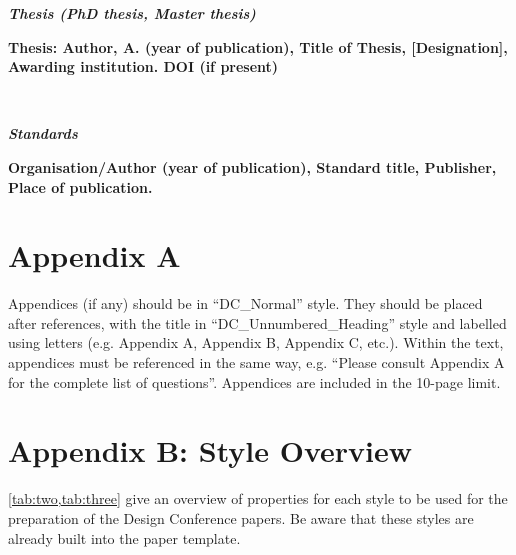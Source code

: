 \documentclass{design}
\begin{document}
\textbf{\textit{Thesis (PhD thesis, Master thesis)}}

\begin{hangparas}{0.63cm}{1}
\textbf{Thesis: Author, A. (year of publication), Title of Thesis, [Designation], Awarding institution. DOI (if present)}

\\[-0.5em]

\end{hangparas}


\textbf{\textit{Standards}}

\begin{hangparas}{0.63cm}{1}
\textbf{Organisation/Author (year of publication), Standard title, Publisher, Place of publication.}

\end{hangparas}


\section*{Appendix A}

Appendices (if any) should be in “DC\_Normal” style. They should be placed after references, with the title in “DC\_Unnumbered\_Heading” style and labelled using letters (e.g. Appendix A, Appendix B, Appendix C, etc.). Within the text, appendices must be referenced in the same way, e.g. “Please consult Appendix A for the complete list of questions”. Appendices are included in the 10-page limit.

\section*{Appendix B: Style Overview}

\cref{tab:two,tab:three} give an overview of properties for each style to be used for the preparation of the Design Conference papers. Be aware that these styles are already built into the paper template.
\end{document}
